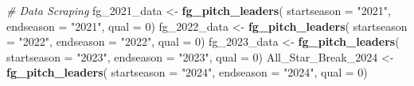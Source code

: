 \documentclass[
]{article}
\newenvironment{Shaded}{\begin{snugshade}}{\end{snugshade}}
\newcommand{\AttributeTok}[1]{\textcolor[rgb]{0.13,0.29,0.53}{#1}}
\newcommand{\CommentTok}[1]{\textcolor[rgb]{0.56,0.35,0.01}{\textit{#1}}}
\newcommand{\DecValTok}[1]{\textcolor[rgb]{0.00,0.00,0.81}{#1}}
\newcommand{\FunctionTok}[1]{\textcolor[rgb]{0.13,0.29,0.53}{\textbf{#1}}}
\newcommand{\NormalTok}[1]{#1}
\newcommand{\OtherTok}[1]{\textcolor[rgb]{0.56,0.35,0.01}{#1}}
\newcommand{\StringTok}[1]{\textcolor[rgb]{0.31,0.60,0.02}{#1}}
\begin{document}
\begin{Shaded}
\begin{Highlighting}[]
\CommentTok{\# Data Scraping}
\NormalTok{fg\_2021\_data }\OtherTok{\textless{}{-}} \FunctionTok{fg\_pitch\_leaders}\NormalTok{( }\AttributeTok{startseason =} \StringTok{"2021"}\NormalTok{, }\AttributeTok{endseason =} \StringTok{"2021"}\NormalTok{, }\AttributeTok{qual =} \DecValTok{0}\NormalTok{)}
\NormalTok{fg\_2022\_data }\OtherTok{\textless{}{-}} \FunctionTok{fg\_pitch\_leaders}\NormalTok{( }\AttributeTok{startseason =} \StringTok{"2022"}\NormalTok{, }\AttributeTok{endseason =} \StringTok{"2022"}\NormalTok{, }\AttributeTok{qual =} \DecValTok{0}\NormalTok{)}
\NormalTok{fg\_2023\_data }\OtherTok{\textless{}{-}} \FunctionTok{fg\_pitch\_leaders}\NormalTok{( }\AttributeTok{startseason =} \StringTok{"2023"}\NormalTok{, }\AttributeTok{endseason =} \StringTok{"2023"}\NormalTok{, }\AttributeTok{qual =} \DecValTok{0}\NormalTok{)}
\NormalTok{All\_Star\_Break\_2024 }\OtherTok{\textless{}{-}} \FunctionTok{fg\_pitch\_leaders}\NormalTok{( }\AttributeTok{startseason =} \StringTok{"2024"}\NormalTok{, }\AttributeTok{endseason =} \StringTok{"2024"}\NormalTok{, }\AttributeTok{qual =} \DecValTok{0}\NormalTok{)}
\end{Highlighting}
\end{Shaded}
\end{document}
